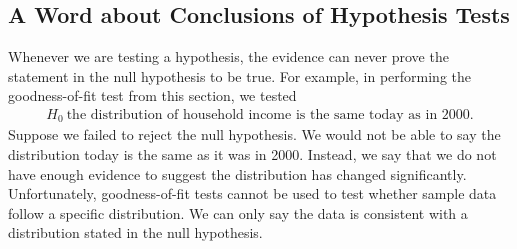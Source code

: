 \documentclass{report}
\begin{document}
    \bigbreak \noindent \bigbreak \noindent 
    \subsection*{A Word about Conclusions of Hypothesis Tests}
    \bigbreak \noindent 
        Whenever we are testing a hypothesis, the evidence can never prove the statement in the null hypothesis to be true. For example, in performing the goodness-of-fit test from this section, we tested
    \begin{align*}
        H_0\: \text{the distribution of household income is the same today as in 2000}
    .\end{align*}
    \bigbreak \noindent 
    Suppose we failed to reject the null hypothesis. We would not be able to say the distribution today is the same as it was in 2000. Instead, we say that we do not have enough evidence to suggest the distribution has changed significantly.
    \bigbreak \noindent 
    Unfortunately, goodness-of-fit tests cannot be used to test whether sample data follow a specific distribution. We can only say the data is consistent with a distribution stated in the null hypothesis.

    \pagebreak 
\end{document}
